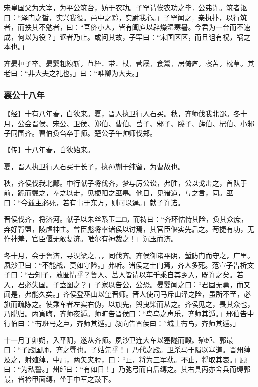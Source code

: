 \documentclass[]{article}
\begin{document}
宋皇国父为大宰，为平公筑台，妨于农功。子罕请俟农功之毕，公弗许。筑者讴曰：``泽门之皙，实兴我役。邑中之黔，实尉我心。」子罕闻之，亲执扑，以行筑者，而抶其不勉者，曰：``吾侪小人，皆有阖庐以辟燥湿寒暑。今君为一台而不速成，何以为役？」讴者乃止。或问其故，子罕曰：``宋国区区，而且诅有祝，祸之本也。」

齐晏桓子卒。晏婴粗縗斩，苴絰、带、杖，菅屦，食鬻，居倚庐，寝苫，枕草。其老曰：``非大夫之礼也。」曰：``唯卿为大夫。」

\hypertarget{header-n2055}{%
\subsubsection{襄公十八年}\label{header-n2055}}

【经】十有八年春，白狄来。夏，晋人执卫行人石买。秋，齐师伐我北鄙。冬十月，公会晋侯、宋公、卫侯、郑伯、曹伯、莒子、邾子、滕子、薛伯、杞伯、小邾子同围齐。曹伯负刍卒于师。楚公子午帅师伐郑。

【传】十八年春，白狄始来。

夏，晋人执卫行人石买于长子，执孙蒯于纯留，为曹故也。

秋，齐侯伐我北鄙。中行献子将伐齐，梦与厉公讼，弗胜，公以戈击之，首队于前，跪而戴之，奉之以走，见梗阳之巫皋。他日，见诸道，与之言，同。巫曰：``今兹主必死，若有事于东方，则可以逞。」献子许诺。

晋侯伐齐，将济河。献子以朱丝系玉二□，而祷曰：``齐环怙恃其险，负其众庶，弃好背盟，陵虐神主。曾臣彪将率诸侯以讨焉，其官臣偃实先后之。苟捷有功，无作神羞，官臣偃无敢复济。唯尔有神裁之！」沉玉而济。

冬十月，会于鲁济，寻湨梁之言，同伐齐。齐侯御诸平阴，堑防门而守之，广里。夙沙卫曰：``不能战，莫如守险。」弗听。诸侯之士门焉，齐人多死。范宣子告析文子曰：``吾知子，敢匿情乎？鲁人、莒人皆请以车千乘自其乡入，既许之矣。若入，君必失国。子盍图之？」子家以告公，公恐。晏婴闻之曰：``君固无勇，而又闻是，弗能久矣。」齐侯登巫山以望晋师。晋人使司马斥山泽之险，虽所不至，必旗而疏陈之。使乘车者左实右伪，以旗先，舆曳柴而从之。齐侯见之，畏其众也，乃脱归。丙寅晦，齐师夜遁。师旷告晋侯曰：``鸟乌之声乐，齐师其遁。」邢伯告中行伯曰：``有班马之声，齐师其遁。」叔向告晋侯曰：``城上有乌，齐师其遁。」

十一月丁卯朔，入平阴，遂从齐师。夙沙卫连大车以塞隧而殿。殖绰、郭最曰：``子殿国师，齐之辱也。子姑先乎！」乃代之殿。卫杀马于隘以塞道。晋州绰及之，射殖绰，中肩，两矢夹脰，曰：``止，将为三军获。不止，将取其衷。」顾曰：``为私誓。」州绰曰：``有如日！」乃弛弓而自后缚之。其右具丙亦舍兵而缚郭最，皆衿甲面缚，坐于中军之鼓下。
\end{document}
